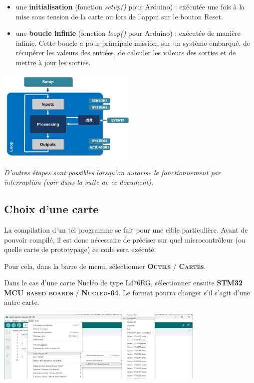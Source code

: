 \documentclass[a4paper,11pt,titlepage]{article} %
\begin{document}
\begin{itemize}
	\item une \textbf{initialisation} (fonction \textsl{setup()} pour Arduino) : exécutée une fois à la mise sous tension de la carte ou lors de l'appui sur le bouton Reset.
	\item une \textbf{boucle infinie} (fonction \textsl{loop()} pour Arduino) : exécutée de manière infinie. Cette boucle a pour principale mission, sur un système embarqué, de récupérer les valeurs des entrées, de calculer les valeurs des sorties et de mettre à jour les sorties.
\end{itemize}

\begin{center}
	\includegraphics[width=0.5\textwidth]{images/arduino_program_structure.png}
\end{center}

\textit{D'autres étapes sont possibles lorsqu'on autorise le fonctionnement par interruption (voir dans la suite de ce document).}



\subsection{Choix d'une carte}

La compilation d'un tel programme se fait pour une cible particulière. Avant de pouvoir compilé, il est donc nécessaire de préciser sur quel microcontrôleur (ou quelle carte de prototypage) ce code sera exécuté.

Pour cela, dans la barre de menu, sélectionner \textsc{\textbf{Outils} / \textbf{Cartes}}.

Dans le cas d'une carte Nucléo de type L476RG, sélectionner ensuite \textsc{\textbf{STM32 MCU based boards} / \textbf{Nucleo-64}}. Le format pourra changer s'il s'agit d'une autre carte.

\begin{center}
	\includegraphics[width=0.75\textwidth]{images/arduino_outils_cartes_nucleo64.png}
\end{center}
\end{document}

